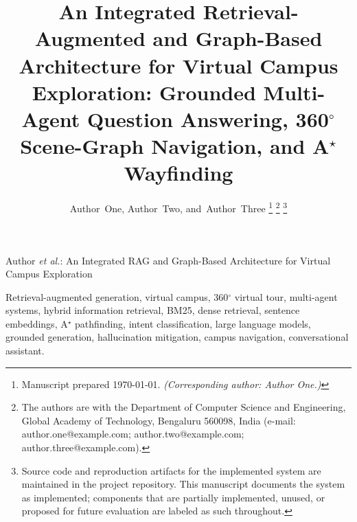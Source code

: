 \documentclass[journal]{IEEEtran}
\begin{document}
\title{An Integrated Retrieval-Augmented and Graph-Based Architecture for
Virtual Campus Exploration: Grounded Multi-Agent Question Answering, 360$^{\circ}$
Scene-Graph Navigation, and A$^{\star}$ Wayfinding}

\author{
        Author~One,
        Author~Two,
        and~Author~Three%
\thanks{Manuscript prepared \today. \emph{(Corresponding author: Author One.)}}
\thanks{The authors are with the Department of Computer Science and
Engineering, Global Academy of Technology, Bengaluru 560098, India
(e-mail: author.one@example.com; author.two@example.com;
author.three@example.com).}
\thanks{Source code and reproduction artifacts for the implemented system are
maintained in the project repository. This manuscript documents the system
as implemented; components that are partially implemented, unused, or
proposed for future evaluation are labeled as such throughout.}
}

%
{Author \MakeLowercase{\textit{et al.}}: An Integrated RAG and Graph-Based Architecture for Virtual Campus Exploration}

\maketitle

\begin{abstract}

\end{abstract}

\begin{IEEEkeywords}
Retrieval-augmented generation, virtual campus, 360$^{\circ}$ virtual tour,
multi-agent systems, hybrid information retrieval, BM25, dense retrieval,
sentence embeddings, A$^{\star}$ pathfinding, intent classification, large
language models, grounded generation, hallucination mitigation, campus
navigation, conversational assistant.
\end{IEEEkeywords}




















\end{document}
